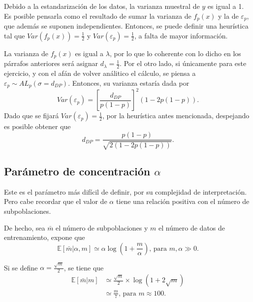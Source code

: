 Debido a la estandarizaci\'on de los datos, la varianza muestral de $y$ es igual a 1. Es posible pensarla como el resultado de sumar la varianza de $f_p(x)$ y la de $\varepsilon_p$, que adem\'as se suponen independientes. Entonces, se puede definir una heur\'istica tal que $Var(f_p(x)) = \frac{1}{2}$ y $Var(\varepsilon_p) = \frac{1}{2}$, a falta de mayor informaci\'on.

La varianza de $f_p(x)$ es igual a $\lambda$, por lo que lo coherente con lo dicho en los p\'arrafos anteriores ser\'a asignar $d_\lambda = \frac{1}{2}$. 
Por el otro lado, si \'unicamente para este ejercicio, y con el af\'an de volver an\'alitico el c\'alculo, se piensa a $\varepsilon_p \sim AL_p(\sigma = d_{DP})$. Entonces, su varianza estar\'ia dada por
\begin{equation*}
    Var(\varepsilon_p) = 
    \left[\frac{d_{DP}}{p(1-p)}\right]^2
    (1-2p(1-p)).
\end{equation*}
Dado que se fijar\'a $Var(\varepsilon_p) = \frac{1}{2}$, por la heur\'istica antes mencionada, despejando es posible obtener que
\begin{equation*}
    d_{DP} = \frac{p(1-p)}{\sqrt{2(1-2p(1-p))}}.
\end{equation*}

\subsection{Par\'ametro de concentraci\'on $\alpha$}

Este es el par\'ametro m\'as dif\'icil de definir, por su complejidad de interpretaci\'on. Pero cabe recordar que el valor de $\alpha$ tiene una relaci\'on positiva con el n\'umero de subpoblaciones. 

De hecho, sea $\bar{m}$ el n\'umero de subpoblaciones y $m$ el n\'umero de datos de entrenamiento, \cite{Yee_DirProc} expone que
\begin{equation*}
    \mathbb{E}[\bar{m}|\alpha, m] 
    \simeq 
    \alpha
    \log 
    \left(
        1 + \frac{m}{\alpha}
    \right)
    \text{, para } m, \alpha \gg 0.
\end{equation*}

Si se define $\alpha = \frac{\sqrt{m}}{2}$, se tiene que
\begin{equation*}
\begin{aligned}
    \mathbb{E}[\bar{m}|m] 
    &\simeq 
    \frac{\sqrt{m}}{2}
    \times
    \log 
    \left(
        1 + 2\sqrt{m}
    \right)\\
    &\simeq
    \frac{m}{7} 
    \text{, para } m \approx 100.
\end{aligned}
\end{equation*}

